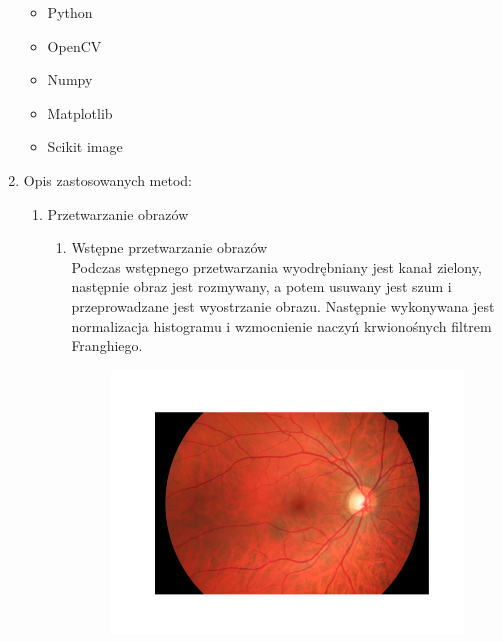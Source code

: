 \documentclass{article}
\begin{document}
\begin{enumerate}
\begin{itemize}
              \item Python
              \item OpenCV
              \item Numpy
              \item Matplotlib
              \item Scikit image
          \end{itemize}
    \item Opis zastosowanych metod:
          \begin{enumerate}
              \item Przetwarzanie obrazów
                    \begin{enumerate}
                        \item Wstępne przetwarzanie obrazów\\
                              Podczas wstępnego przetwarzania wyodrębniany jest kanał zielony,
                              następnie obraz jest rozmywany, a potem usuwany jest szum i przeprowadzane jest
                              wyostrzanie obrazu. Następnie wykonywana jest normalizacja histogramu i
                              wzmocnienie naczyń krwionośnych filtrem Franghiego.
                              \begin{figure}[h]
                                  \centering
                                  \begin{minipage}{0.47\textwidth}
                                      \centering
                                      \includegraphics[width=\linewidth]{../res/sample-original-image.png}
                                  \end{minipage}

\end{figure}
\end{enumerate}
\end{enumerate}
\end{enumerate}
\end{document}
